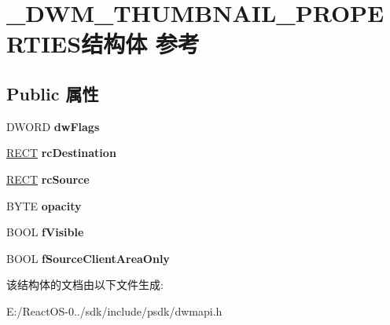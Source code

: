 \hypertarget{struct___d_w_m___t_h_u_m_b_n_a_i_l___p_r_o_p_e_r_t_i_e_s}{}\section{\+\_\+\+D\+W\+M\+\_\+\+T\+H\+U\+M\+B\+N\+A\+I\+L\+\_\+\+P\+R\+O\+P\+E\+R\+T\+I\+E\+S结构体 参考}
\label{struct___d_w_m___t_h_u_m_b_n_a_i_l___p_r_o_p_e_r_t_i_e_s}
\subsection*{Public 属性}
\begin{DoxyCompactItemize}
\item 
\mbox{\label{struct___d_w_m___t_h_u_m_b_n_a_i_l___p_r_o_p_e_r_t_i_e_s_aa4c4707112e04a30719a208f43b39ad8}} 
D\+W\+O\+RD {\bfseries dw\+Flags}
\item 
\mbox{\label{struct___d_w_m___t_h_u_m_b_n_a_i_l___p_r_o_p_e_r_t_i_e_s_a9f80c27c4cd595b8e8273760d07020c7}} 
\hyperlink{structtag_r_e_c_t}{R\+E\+CT} {\bfseries rc\+Destination}
\item 
\mbox{\label{struct___d_w_m___t_h_u_m_b_n_a_i_l___p_r_o_p_e_r_t_i_e_s_a9e3be84e706c3415e24f9cf03b2f68b2}} 
\hyperlink{structtag_r_e_c_t}{R\+E\+CT} {\bfseries rc\+Source}
\item 
\mbox{\label{struct___d_w_m___t_h_u_m_b_n_a_i_l___p_r_o_p_e_r_t_i_e_s_a7c89fa43acedde9a8595edc247e602b0}} 
B\+Y\+TE {\bfseries opacity}
\item 
\mbox{\label{struct___d_w_m___t_h_u_m_b_n_a_i_l___p_r_o_p_e_r_t_i_e_s_a7b165405193c46fc0a215d5be4932593}} 
B\+O\+OL {\bfseries f\+Visible}
\item 
\mbox{\label{struct___d_w_m___t_h_u_m_b_n_a_i_l___p_r_o_p_e_r_t_i_e_s_a61712e8bf1a7afe28823dde1ef4f9b63}} 
B\+O\+OL {\bfseries f\+Source\+Client\+Area\+Only}
\end{DoxyCompactItemize}


该结构体的文档由以下文件生成\+:\begin{DoxyCompactItemize}
\item 
E\+:/\+React\+O\+S-\/0../sdk/include/psdk/dwmapi.\+h\end{DoxyCompactItemize}
